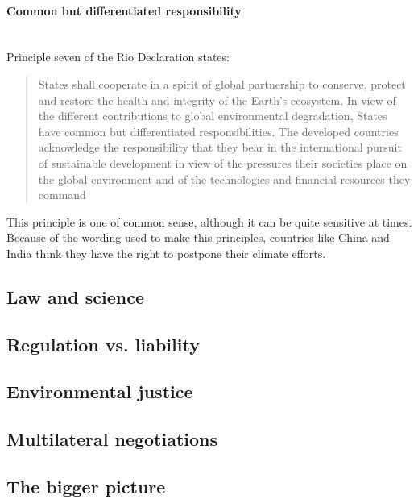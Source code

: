 \documentclass[../summary.tex]{subfiles}
\begin{document}
			\paragraph{Common but differentiated responsibility}\mbox{}\\
				Principle seven of the Rio Declaration states:
				\begin{quote}
					States shall cooperate in a spirit of global partnership to conserve, protect and restore the health and integrity of the Earth's ecosystem. In view of the different contributions to global environmental degradation, States have common but differentiated responsibilities. The developed countries acknowledge the responsibility that they bear in the international pursuit of sustainable development in view of the pressures their societies place on the global environment and of the technologies and financial resources they command
				\end{quote}
				This principle is one of common sense, although it can be quite sensitive at times. Because of the wording used to make this principles, countries like China and India think they have the right to postpone their climate efforts. 
	\subsection{Law and science}
	
	\subsection{Regulation vs. liability}
	
	\subsection{Environmental justice}
	
	\subsection{Multilateral negotiations}
	
	\subsection{The bigger picture}
\end{document}
